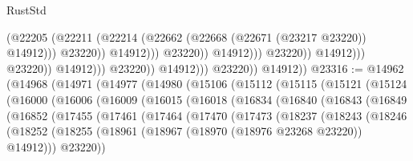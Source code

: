 \begin{lexlean}{RustStd}
\begin{coremodule}
                                                          (@22205
                                                            (@22211
                                                              (@22214
                                                                (@22662
                                                                  (@22668
                                                                    (@22671 (@23217 @23220))
                                                                    @14912)))
                                                              @23220))
                                                          @14912)))
                                                    @23220))
                                                @14912)))
                                          @23220))
                                      @14912)))
                                @23220))
                            @14912)))
                      @23220))
                  @14912)))
            @23220))
        @14912))
@23316 := @14962
    (@14968
      (@14971
        (@14977
          (@14980
            (@15106
              (@15112
                (@15115
                  (@15121
                    (@15124
                      (@16000
                        (@16006
                          (@16009
                            (@16015
                              (@16018
                                (@16834
                                  (@16840
                                    (@16843
                                      (@16849
                                        (@16852
                                          (@17455
                                            (@17461
                                              (@17464
                                                (@17470
                                                  (@17473
                                                    (@18237
                                                      (@18243
                                                        (@18246
                                                          (@18252
                                                            (@18255
                                                              (@18961
                                                                (@18967
                                                                  (@18970 (@18976 @23268 @23220))
                                                                  @14912)))
                                                            @23220))

\end{coremodule}
\end{lexlean}
